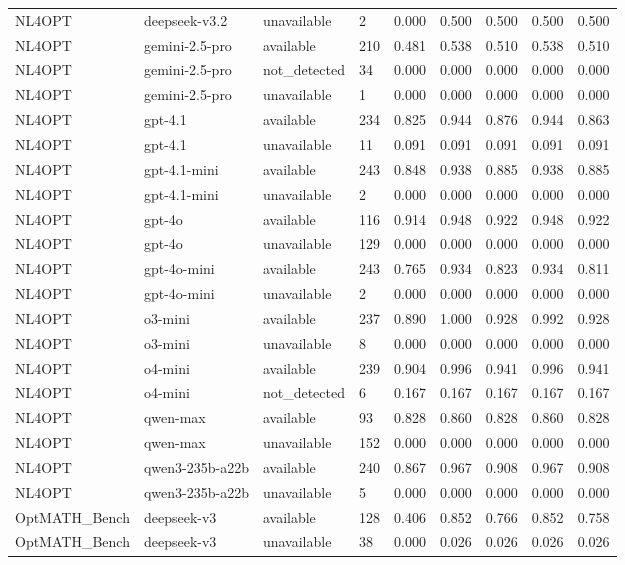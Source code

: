 \begin{table}[t]
\begin{tabular}{lllllllll}
NL4OPT & deepseek-v3.2 & unavailable & 2 & 0.000 & 0.500 & 0.500 & 0.500 & 0.500 \\
NL4OPT & gemini-2.5-pro & available & 210 & 0.481 & 0.538 & 0.510 & 0.538 & 0.510 \\
NL4OPT & gemini-2.5-pro & not\_detected & 34 & 0.000 & 0.000 & 0.000 & 0.000 & 0.000 \\
NL4OPT & gemini-2.5-pro & unavailable & 1 & 0.000 & 0.000 & 0.000 & 0.000 & 0.000 \\
NL4OPT & gpt-4.1 & available & 234 & 0.825 & 0.944 & 0.876 & 0.944 & 0.863 \\
NL4OPT & gpt-4.1 & unavailable & 11 & 0.091 & 0.091 & 0.091 & 0.091 & 0.091 \\
NL4OPT & gpt-4.1-mini & available & 243 & 0.848 & 0.938 & 0.885 & 0.938 & 0.885 \\
NL4OPT & gpt-4.1-mini & unavailable & 2 & 0.000 & 0.000 & 0.000 & 0.000 & 0.000 \\
NL4OPT & gpt-4o & available & 116 & 0.914 & 0.948 & 0.922 & 0.948 & 0.922 \\
NL4OPT & gpt-4o & unavailable & 129 & 0.000 & 0.000 & 0.000 & 0.000 & 0.000 \\
NL4OPT & gpt-4o-mini & available & 243 & 0.765 & 0.934 & 0.823 & 0.934 & 0.811 \\
NL4OPT & gpt-4o-mini & unavailable & 2 & 0.000 & 0.000 & 0.000 & 0.000 & 0.000 \\
NL4OPT & o3-mini & available & 237 & 0.890 & 1.000 & 0.928 & 0.992 & 0.928 \\
NL4OPT & o3-mini & unavailable & 8 & 0.000 & 0.000 & 0.000 & 0.000 & 0.000 \\
NL4OPT & o4-mini & available & 239 & 0.904 & 0.996 & 0.941 & 0.996 & 0.941 \\
NL4OPT & o4-mini & not\_detected & 6 & 0.167 & 0.167 & 0.167 & 0.167 & 0.167 \\
NL4OPT & qwen-max & available & 93 & 0.828 & 0.860 & 0.828 & 0.860 & 0.828 \\
NL4OPT & qwen-max & unavailable & 152 & 0.000 & 0.000 & 0.000 & 0.000 & 0.000 \\
NL4OPT & qwen3-235b-a22b & available & 240 & 0.867 & 0.967 & 0.908 & 0.967 & 0.908 \\
NL4OPT & qwen3-235b-a22b & unavailable & 5 & 0.000 & 0.000 & 0.000 & 0.000 & 0.000 \\
OptMATH\_Bench & deepseek-v3 & available & 128 & 0.406 & 0.852 & 0.766 & 0.852 & 0.758 \\
OptMATH\_Bench & deepseek-v3 & unavailable & 38 & 0.000 & 0.026 & 0.026 & 0.026 & 0.026 \\

\end{tabular}
\end{table}
